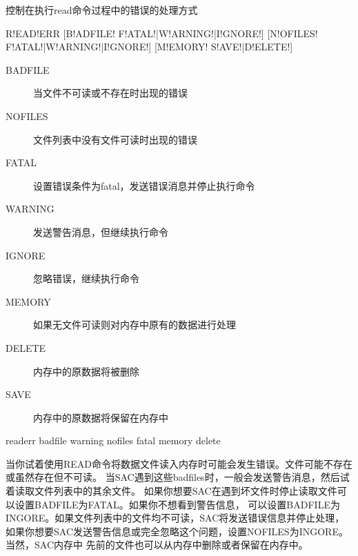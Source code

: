 \label{cmd:readerr}

控制在执行read命令过程中的错误的处理方式

\begin{SACSTX}
R!EAD!ERR [B!ADFILE! F!ATAL!|W!ARNING!|I!GNORE!]
          [N!OFILES! F!ATAL!|W!ARNING!|I!GNORE!]
          [M!EMORY! S!AVE!|D!ELETE!]
\end{SACSTX}

\begin{description}
\item [BADFILE] 当文件不可读或不存在时出现的错误
\item [NOFILES] 文件列表中没有文件可读时出现的错误
\item [FATAL] 设置错误条件为fatal，发送错误消息并停止执行命令
\item [WARNING] 发送警告消息，但继续执行命令
\item [IGNORE] 忽略错误，继续执行命令
\item [MEMORY] 如果无文件可读则对内存中原有的数据进行处理
\item [DELETE] 内存中的原数据将被删除
\item [SAVE] 内存中的原数据将保留在内存中
\end{description}

\begin{SACDFT}
readerr badfile warning nofiles fatal memory delete
\end{SACDFT}

当你试着使用READ命令将数据文件读入内存时可能会发生错误。文件可能不存在或虽然存在但不可读。
当SAC遇到这些badfiles时，一般会发送警告消息，然后试着读取文件列表中的其余文件。
如果你想要SAC在遇到坏文件时停止读取文件可以设置BADFILE为FATAL。如果你不想看到警告信息，
可以设置BADFILE为INGORE。如果文件列表中的文件均不可读，SAC将发送错误信息并停止处理，
如果你想要SAC发送警告信息或完全忽略这个问题，设置NOFILES为INGORE。当然，SAC内存中
先前的文件也可以从内存中删除或者保留在内存中。
